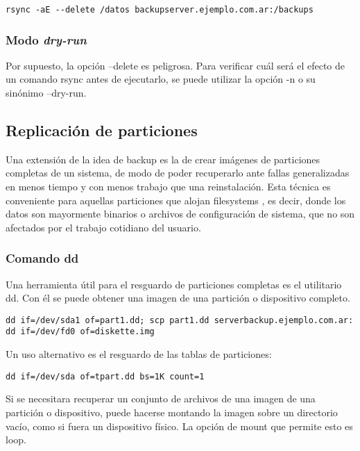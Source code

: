 \begin{lstlisting}
rsync -aE --delete /datos backupserver.ejemplo.com.ar:/backups
\end{lstlisting}

\subsubsection{Modo \emph{dry-run}}

Por supuesto, la opción –delete es peligrosa. Para verificar cuál será el efecto de un comando rsync antes de ejecutarlo, se puede utilizar la opción -n o su sinónimo –dry-run.

\subsection{Replicación de particiones}

Una extensión de la idea de backup es la de crear imágenes de particiones completas de un sistema, de modo de poder recuperarlo ante fallas generalizadas en menos tiempo y con menos trabajo que una reinstalación. Esta técnica es conveniente para aquellas particiones que alojan filesystems , es decir, donde los datos son mayormente binarios o archivos de configuración de sistema, que no son afectados por el trabajo cotidiano del usuario.

\subsubsection{Comando dd}
Una herramienta útil para el resguardo de particiones completas es el utilitario dd. Con él se puede obtener una imagen de una partición o dispositivo completo. 

\begin{lstlisting}
dd if=/dev/sda1 of=part1.dd; scp part1.dd serverbackup.ejemplo.com.ar:
dd if=/dev/fd0 of=diskette.img
\end{lstlisting}

Un uso alternativo es el resguardo de las tablas de particiones:

\begin{lstlisting}
dd if=/dev/sda of=tpart.dd bs=1K count=1
\end{lstlisting}

Si se necesitara recuperar un conjunto de archivos de una imagen de una partición o dispositivo, puede hacerse montando la imagen sobre un directorio vacío, como si fuera un dispositivo físico. La opción de mount que permite esto es loop.

